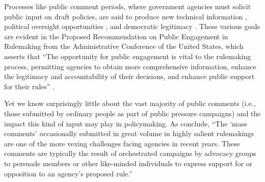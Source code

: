 \documentclass{article}
\begin{document}

Processes like public comment periods, where government agencies must solicit public input on draft policies, are said to produce new technical information \citep{Yackee2006JPART, Nelson2012}, political oversight opportunities \citep{Balla1998, Mccubbins1984}, and democratic legitimacy \citep{Croley2003, Rosenbloom2003}. %
These various goals are evident in the Proposed Recommendation on Public Engagement in Rulemaking from the Administrative Conference of the United States, which asserts that ``The opportunity for public engagement is vital to the rulemaking process, permitting agencies to obtain more comprehensive information, enhance the legitimacy and accountability of their decisions, and enhance public support for their rules'' \citep{ACUS2018}. %

Yet we know surprisingly little about the vast majority of public comments (i.e., those submitted by ordinary people as part of public pressure campaigns) and the impact this kind of input may play in policymaking. As \citet{SantAmbrogio2018} conclude, ``The `mass comments' occasionally submitted in great volume in highly salient rulemakings are one of the more vexing challenges facing agencies in recent years. These comments are typically the result of orchestrated campaigns by advocacy groups to persuade members or other like-minded individuals to express support for or opposition to an agency's proposed rule.''
\end{document}
